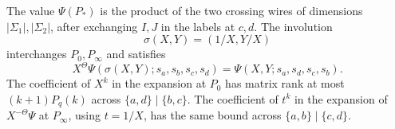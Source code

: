 \begin{theorem}\label{thm:curve-crossing}
The value $\Psi(P_*)$ is the product of the two crossing wires of dimensions $|\Sigma_1|,|\Sigma_2|$, after exchanging $I,J$ in the labels at $c,d$. The involution
\[
 \sigma(X,Y)=(1/X,Y/X)
\]
interchanges $P_0,P_\infty$ and satisfies
\begin{equation}\label{eq:curve-reflection}
 X^\Theta\Psi(\sigma(X,Y);s_a,s_b,s_c,s_d)
 =\Psi(X,Y;s_a,s_d,s_c,s_b).
\end{equation}
The coefficient of $X^k$ in the expansion at $P_0$ has matrix rank at most $(k+1)P_q(k)$ across $\{a,d\}\mid\{b,c\}$. The coefficient of $t^k$ in the expansion of $X^{-\Theta}\Psi$ at $P_\infty$, using $t=1/X$, has the same bound across $\{a,b\}\mid\{c,d\}$.
\end{theorem}
